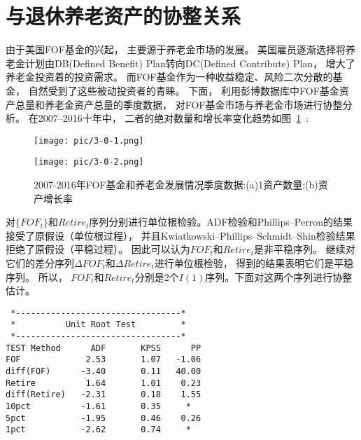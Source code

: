 
\section{与退休养老资产的协整关系}
由于美国FOF基金的兴起， 主要源于养老金市场的发展。 美国雇员逐渐选择将养老金计划由DB(Defined Benefit) Plan转向DC(Defined Contribute) Plan， 增大了养老金投资着的投资需求。 而FOF基金作为一种收益稳定、风险二次分散的基金， 自然受到了这些被动投资者的青睐。 下面， 利用彭博数据库中FOF基金资产总量和养老金资产总量的季度数据， 对FOF基金市场与养老金市场进行协整分析。 在2007--2016十年中， 二者的绝对数量和增长率变化趋势如图~\ref{pic:3-0}~:



\begin{figure}[h!]
	\begin{minipage}[ht]{0.47\textwidth}
		\centering
		\texttt{[image: pic/3-0-1.png]}
		\subcaption{}\label{pic/3-0-1.png}
	\end{minipage}%
	\hspace{0.06\textwidth}
	\begin{minipage}[ht]{0.47\textwidth}
		\centering
		\texttt{[image: pic/3-0-2.png]}
		\subcaption{}\label{pic/3-0-2.png}
	\end{minipage}
	\caption{2007-2016年FOF基金和养老金发展情况季度数据:(a)1资产数量;(b)资产增长率} \label{pic:3-0}
\end{figure}





对$\{FOF_t\}$和${Retire_t}$序列分别进行单位根检验。ADF检验和Phillips–Perron的结果接受了原假设（单位根过程）， 并且Kwiatkowski–Phillips–Schmidt–Shin检验结果拒绝了原假设（平稳过程）。 因此可以认为${FOF_t}$和${Retire_t}$是非平稳序列。
继续对它们的差分序列${\Delta FOF_t}$和${\Delta Retire_t}$进行单位根检验， 得到的结果表明它们是平稳序列。 所以， ${FOF_t}$和${Retire_t}$分别是2个$I(1)$序列。下面对这两个序列进行协整估计。

\begin{framed}
\begin{verbatim}
 *---------------------------------*                         
 *          Unit Root Test         *                           
 *---------------------------------*
TEST Method      ADF       KPSS      PP  
FOF             2.53       1.07   -1.06
diff(FOF)      -3.40       0.11   40.00
Retire          1.64       1.01    0.23
diff(Retire)   -2.31       0.18    1.55
10pct          -1.61       0.35     *  
5pct           -1.95       0.46    0.26
1pct           -2.62       0.74     *  
\end{verbatim}
\end{framed}


